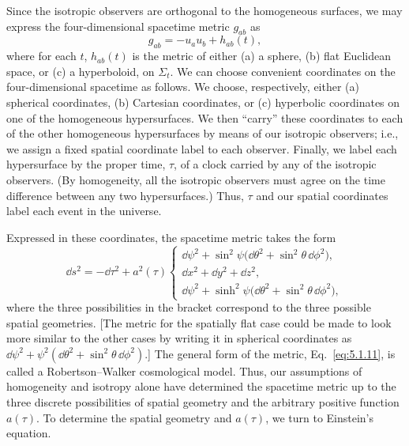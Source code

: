 Since the isotropic observers are orthogonal to the homogeneous surfaces, we may
express the four-dimensional spacetime metric \(g_{ab}\) as
\begin{equation}
  g_{ab}=-u_a u_b+h_{ab}(t),
  \tag{5.1.10}\label{eq:5.1.10}
\end{equation}
where for each \(t\), \(h_{ab}(t)\) is the metric of either (a) a sphere, (b) flat
Euclidean space, or (c) a hyperboloid, on \(\Sigma_t\). We can choose convenient
coordinates on the four-dimensional spacetime as follows. We choose, respectively,
either (a) spherical coordinates, (b) Cartesian coordinates, or (c) hyperbolic
coordinates on one of the homogeneous hypersurfaces. We then ``carry'' these
coordinates to each of the other homogeneous hypersurfaces by means of our
isotropic observers; i.e., we assign a fixed spatial coordinate label to each observer.
Finally, we label each hypersurface by the proper time, \(\tau\), of a clock carried by
any of the isotropic observers. (By homogeneity, all the isotropic observers must
agree on the time difference between any two hypersurfaces.) Thus, \(\tau\) and our
spatial coordinates label each event in the universe.

Expressed in these coordinates, the spacetime metric takes the form
\begin{equation}
  \dd s^2=-\dd\tau^2+a^2(\tau)
  \begin{cases}
    \dd\psi^2+\sin^2\psi\bigl(\dd\theta^2+\sin^2\theta\,\dd\phi^2\bigr),\\
    \dd x^2+\dd y^2+\dd z^2,\\
    \dd\psi^2+\sinh^2\psi\bigl(\dd\theta^2+\sin^2\theta\,\dd\phi^2\bigr),
  \end{cases}
  \tag{5.1.11}\label{eq:5.1.11}
\end{equation}
where the three possibilities in the bracket correspond to the three possible spatial
geometries. [The metric for the spatially flat case could be made to look more
similar to the other cases by writing it in spherical coordinates as
\(\dd\psi^2+\psi^2(\dd\theta^2+\sin^2\theta\,\dd\phi^2)\).] The general form of the
metric, Eq.~\eqref{eq:5.1.11}, is called a Robertson--Walker cosmological model.
Thus, our assumptions of homogeneity and isotropy alone have determined the
spacetime metric up to the three discrete possibilities of spatial geometry and the
arbitrary positive function \(a(\tau)\). To determine the spatial geometry and
\(a(\tau)\), we turn to Einstein's equation.
